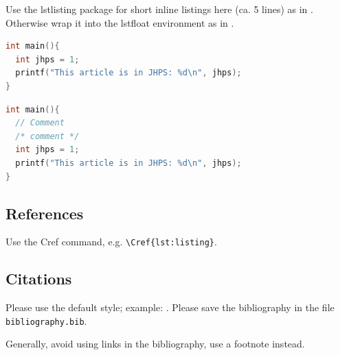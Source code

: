 \documentclass{jhps}
\begin{document}
Use the lstlisting package for short inline listings here (ca. 5 lines) as in .
Otherwise wrap it into the lstfloat environment as in .

\begin{lstlisting}[caption="My listing",label=lst:listing,language=C]
int main(){
  int jhps = 1;
  printf("This article is in JHPS: %d\n", jhps);
}
\end{lstlisting}

\begin{lstfloat}
  \begin{lstlisting}[caption="My longer listing",label=lst:longlisting,language=C]
int main(){
  // Comment
  /* comment */
  int jhps = 1;
  printf("This article is in JHPS: %d\n", jhps);
}
  \end{lstlisting}
\end{lstfloat}


\subsection{References}

Use the Cref command, e.g. \verb|\Cref{lst:listing}|.

\subsection{Citations}

Please use the default style; example: \cite{misc1998}.
Please save the bibliography in the file \texttt{bibliography.bib}.

Generally, avoid using links in the bibliography, use a footnote instead.



\end{document}
